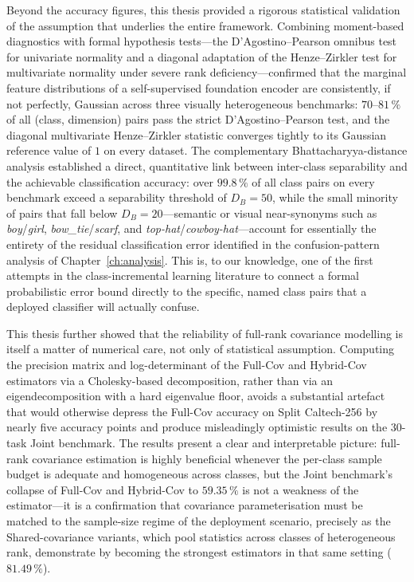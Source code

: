 Beyond the accuracy figures, this thesis provided a rigorous statistical validation of the assumption that underlies the entire framework. Combining moment-based diagnostics with formal hypothesis tests---the D'Agostino--Pearson omnibus test for univariate normality and a diagonal adaptation of the Henze--Zirkler test for multivariate normality under severe rank deficiency---confirmed that the marginal feature distributions of a self-supervised foundation encoder are consistently, if not perfectly, Gaussian across three visually heterogeneous benchmarks: $70$--$81\,\%$ of all (class, dimension) pairs pass the strict D'Agostino--Pearson test, and the diagonal multivariate Henze--Zirkler statistic converges tightly to its Gaussian reference value of $1$ on every dataset. The complementary Bhattacharyya-distance analysis established a direct, quantitative link between inter-class separability and the achievable classification accuracy: over $99.8\,\%$ of all class pairs on every benchmark exceed a separability threshold of $D_B=50$, while the small minority of pairs that fall below $D_B=20$---semantic or visual near-synonyms such as \textit{boy}/\textit{girl}, \textit{bow\_tie}/\textit{scarf}, and \textit{top-hat}/\textit{cowboy-hat}---account for essentially the entirety of the residual classification error identified in the confusion-pattern analysis of Chapter~\ref{ch:analysis}. This is, to our knowledge, one of the first attempts in the class-incremental learning literature to connect a formal probabilistic error bound directly to the specific, named class pairs that a deployed classifier will actually confuse.

This thesis further showed that the reliability of full-rank covariance modelling is itself a matter of numerical care, not only of statistical assumption. Computing the precision matrix and log-determinant of the Full-Cov and Hybrid-Cov estimators via a Cholesky-based decomposition, rather than via an eigendecomposition with a hard eigenvalue floor, avoids a substantial artefact that would otherwise depress the Full-Cov accuracy on Split Caltech-256 by nearly five accuracy points and produce misleadingly optimistic results on the 30-task Joint benchmark. The results present a clear and interpretable picture: full-rank covariance estimation is highly beneficial whenever the per-class sample budget is adequate and homogeneous across classes, but the Joint benchmark's collapse of Full-Cov and Hybrid-Cov to $59.35\,\%$ is not a weakness of the estimator---it is a confirmation that covariance parameterisation must be matched to the sample-size regime of the deployment scenario, precisely as the Shared-covariance variants, which pool statistics across classes of heterogeneous rank, demonstrate by becoming the strongest estimators in that same setting ($81.49\,\%$).

